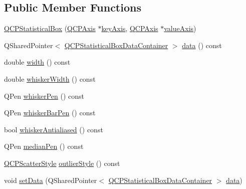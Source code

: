 \subsection*{Public Member Functions}
\begin{DoxyCompactItemize}
\item 
\mbox{\hyperlink{class_q_c_p_statistical_box_a75c2b3e7fcd0741cc981693a2ba63b27}{Q\+C\+P\+Statistical\+Box}} (\mbox{\hyperlink{class_q_c_p_axis}{Q\+C\+P\+Axis}} $\ast$\mbox{\hyperlink{class_q_c_p_abstract_plottable_a2cdd6f0dd5e9a979037f86b4000d9cfe}{key\+Axis}}, \mbox{\hyperlink{class_q_c_p_axis}{Q\+C\+P\+Axis}} $\ast$\mbox{\hyperlink{class_q_c_p_abstract_plottable_af47809a644a68ffd955fb30b01fb4f2f}{value\+Axis}})
\item 
Q\+Shared\+Pointer$<$ \mbox{\hyperlink{qcustomplot_8h_a8b773c0c35f8f924701ced6e9915e4c7}{Q\+C\+P\+Statistical\+Box\+Data\+Container}} $>$ \mbox{\hyperlink{class_q_c_p_statistical_box_a728e501413eaf191544014173d52dfbc}{data}} () const
\item 
double \mbox{\hyperlink{class_q_c_p_statistical_box_ae589b7481dec6ef8e50ebb6492d296f1}{width}} () const
\item 
double \mbox{\hyperlink{class_q_c_p_statistical_box_aacfa6686c7cf4af18794ec02354f4782}{whisker\+Width}} () const
\item 
Q\+Pen \mbox{\hyperlink{class_q_c_p_statistical_box_a67e5144f07645fe25c31001c460817fc}{whisker\+Pen}} () const
\item 
Q\+Pen \mbox{\hyperlink{class_q_c_p_statistical_box_a47ed9ad9d2ca65640319a2f071982ed4}{whisker\+Bar\+Pen}} () const
\item 
bool \mbox{\hyperlink{class_q_c_p_statistical_box_a2015a8ea758cf65a41d4a6c52a20696b}{whisker\+Antialiased}} () const
\item 
Q\+Pen \mbox{\hyperlink{class_q_c_p_statistical_box_af767bc7b6b477d005535314b35aca683}{median\+Pen}} () const
\item 
\mbox{\hyperlink{class_q_c_p_scatter_style}{Q\+C\+P\+Scatter\+Style}} \mbox{\hyperlink{class_q_c_p_statistical_box_aef92e38fcb8e5041a44c2e01886e3b66}{outlier\+Style}} () const
\item 
void \mbox{\hyperlink{class_q_c_p_statistical_box_a08a6da55822bad825ee25a8069b9b52f}{set\+Data}} (Q\+Shared\+Pointer$<$ \mbox{\hyperlink{qcustomplot_8h_a8b773c0c35f8f924701ced6e9915e4c7}{Q\+C\+P\+Statistical\+Box\+Data\+Container}} $>$ \mbox{\hyperlink{class_q_c_p_statistical_box_a728e501413eaf191544014173d52dfbc}{data}})
\item 

\end{DoxyCompactItemize}
